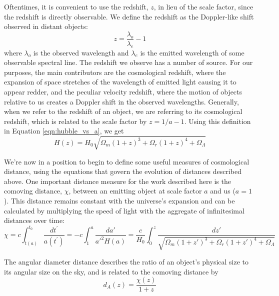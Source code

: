 Oftentimes, it is convenient to use the redshift, $z$, in lieu of the scale factor, since the redshift is directly observable. We define the redshift as the Doppler-like shift observed in distant objects:
\begin{equation}
    z = \frac{\lambda_o}{\lambda_e} - 1
    \label{eqn:z_def}
\end{equation}
where $\lambda_o$ is the observed wavelength and $\lambda_e$ is the emitted wavelength of some observable spectral line. The redshift we observe has a number of source. For our purposes, the main contributors are the cosmological redshift, where the expansion of space stretches of the wavelength of emitted light causing it to appear redder, and the peculiar velocity redshift, where the motion of objects relative to us creates a Doppler shift in the observed wavelengths. Generally, when we refer to the redshift of an object, we are referring to its cosmological redshift, which is related to the scale factor by $z = 1/a - 1$. Using this definition in Equation \ref{eqn:hubble_vs_a}, we get
\begin{equation}
    H(z) = H_0\sqrt{\Omega_m (1+z)^{3} + \Omega_r (1+z)^{4} + \Omega_\Lambda}
\end{equation}

We're now in a position to begin to define some useful measures of cosmological distance, using the equations that govern the evolution of distances described above. One important distance measure for the work described here is the comoving distance, $\chi$, between an emitting object at scale factor $a$ and us ($a=1$). This distance remains constant with the universe's expansion and can be calculated by multiplying the speed of light with the aggregate of infinitesimal distances over time:
\begin{equation}
    \chi = c\displaystyle\int_{t(a)}^{t_0} \frac{dt^\prime}{a(t^\prime)}
    = -c\displaystyle\int_1^a \frac{da'}{a'^2 H(a)}
    = \frac{c}{H_0}\displaystyle\int_0^z \frac{dz'}{\sqrt{\Omega_m(1+z')^3 + \Omega_r(1+z')^4 + \Omega_\Lambda}}
\end{equation}

The angular diameter distance describes the ratio of an object's physical size to its angular size on the sky, and is related to the comoving distance by
$$d_A(z) = \frac{\chi(z)}{1+z}$$

